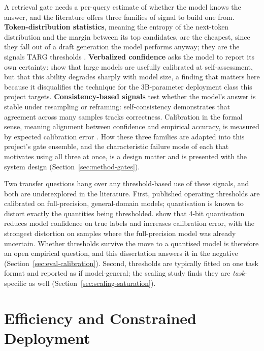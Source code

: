 A retrieval gate needs a per-query estimate of whether the model knows the
answer, and the literature offers three families of signal to build one
from. \textbf{Token-distribution statistics}, meaning the entropy of the
next-token distribution and the margin between its top candidates, are
the cheapest, since they fall out of a draft generation the model performs
anyway; they are the signals TARG thresholds \citep{targ2025}.
\textbf{Verbalized confidence} asks the model to report its own certainty:
\citet{kadavath2022} show that large models are usefully calibrated at
self-assessment, but that this ability degrades sharply with model size,
a finding that matters here because it disqualifies the technique for the
3B-parameter deployment class this project targets.
\textbf{Consistency-based signals} test whether the model's answer is
stable under resampling or reframing: self-consistency
\citep{wang2023selfconsistency} demonstrates that agreement across many
samples tracks correctness. Calibration in the formal sense, meaning
alignment between confidence and empirical accuracy, is measured by expected
calibration error \citep{guo2017calibration}. How these three families are
adapted into this project's gate ensemble, and the characteristic failure
mode of each that motivates using all three at once, is a design matter and
is presented with the system design (Section~\ref{sec:method-gates}).

Two transfer questions hang over any threshold-based use of these signals,
and both are underexplored in the literature. First, published operating
thresholds are calibrated on full-precision, general-domain models;
quantisation is known to distort exactly the quantities being thresholded.
\citet{proskurina2024quantization} show that 4-bit quantisation reduces
model confidence on true labels and increases calibration error, with the
strongest distortion on samples where the full-precision model was already
uncertain. Whether thresholds survive the move to a quantised model is
therefore an open empirical question, and this dissertation answers it in
the negative (Section~\ref{sec:eval-calibration}). Second, thresholds are
typically fitted on one task format and reported as if model-general; the
scaling study finds they are \emph{task}-specific as well
(Section~\ref{sec:scaling-saturation}).

\section{Efficiency and Constrained Deployment}
\label{sec:bg-efficiency}

